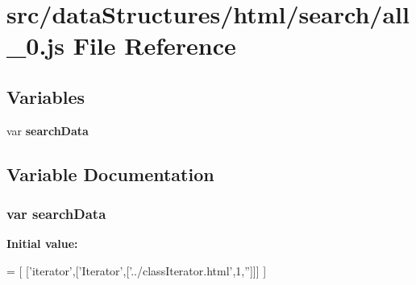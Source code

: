 \section{src/data\-Structures/html/search/all\-\_\-0.js File Reference}
\label{html_2search_2all__0_8js}
\subsection*{Variables}
\begin{DoxyCompactItemize}
\item 
var {\bf search\-Data}
\end{DoxyCompactItemize}


\subsection{Variable Documentation}
\subsubsection[{search\-Data}]{\setlength{\rightskip}{0pt plus 5cm}var search\-Data}\label{html_2search_2all__0_8js_ad01a7523f103d6242ef9b0451861231e}
{\bfseries Initial value\-:}
\begin{DoxyCode}
=
[
  [\textcolor{stringliteral}{'iterator'},[\textcolor{stringliteral}{'Iterator'},[\textcolor{stringliteral}{'../classIterator.html'},1,\textcolor{stringliteral}{''}]]]
]
\end{DoxyCode}
